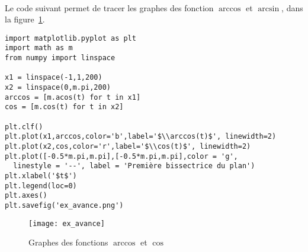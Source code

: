 \exer{[PLT-003]}
\setcounter{numques}{0}~\\

Le code suivant permet de tracer les graphes des fonction $\arccos$ et $\arcsin$, dans la figure~\ref{fig:ex_avance}.
\begin{lstlisting}
import matplotlib.pyplot as plt
import math as m
from numpy import linspace

x1 = linspace(-1,1,200)
x2 = linspace(0,m.pi,200)
arccos = [m.acos(t) for t in x1]
cos = [m.cos(t) for t in x2]

plt.clf()
plt.plot(x1,arccos,color='b',label='$\\arccos(t)$', linewidth=2)
plt.plot(x2,cos,color='r',label='$\\cos(t)$', linewidth=2)
plt.plot([-0.5*m.pi,m.pi],[-0.5*m.pi,m.pi],color = 'g', 
  linestyle = '--', label = 'Première bissectrice du plan')
plt.xlabel('$t$')
plt.legend(loc=0)
plt.axes()
plt.savefig('ex_avance.png')
\end{lstlisting}

\begin{figure}[!h]
  \begin{center}
    \texttt{[image: ex\_avance]}
    \caption{Graphes des fonctions $\arccos$ et $\cos$}
    \label{fig:ex_avance}
  \end{center}
\end{figure}  